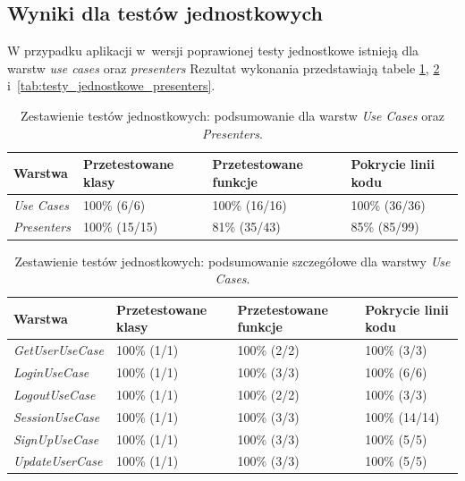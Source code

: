 \subsection{Wyniki dla testów jednostkowych}
W przypadku aplikacji w~wersji poprawionej testy jednostkowe istnieją dla warstw \textit{use cases} oraz \textit{presenters} Rezultat wykonania przedstawiają tabele \ref{tab:testy_jednostkowe_razem}, \ref{tab:testy_jednostkowe_usecases} i~\ref{tab:testy_jednostkowe_presenters}.
\begin{table}[!htb]
\centering
\caption{Zestawienie testów jednostkowych: podsumowanie dla warstw \textit{Use Cases} oraz \textit{Presenters}.}
\label{tab:testy_jednostkowe_razem}
\begin{tabular}{|p{5.8cm}|p{3cm}|p{3cm}|p{3cm}|}
\hline
\textbf{Warstwa} & \textbf{Przetestowane klasy} & \textbf{Przetestowane funkcje} & \textbf{Pokrycie linii kodu} \\ \hline
\textit{Use Cases} & 100\% (6/6) & 100\% (16/16) & 100\% (36/36)	\\ \hline
\textit{Presenters} & 100\% (15/15)	& 81\% (35/43) & 85\% (85/99) \\ \hline
\end{tabular}
\end{table}

\begin{table}[!htb]
\centering
\caption{Zestawienie testów jednostkowych: podsumowanie szczegółowe dla warstwy \textit{Use Cases}.}
\label{tab:testy_jednostkowe_usecases}
\begin{tabular}{|p{5.8cm}|p{3cm}|p{3cm}|p{3cm}|}
\hline
\textbf{Warstwa} & \textbf{Przetestowane klasy} & \textbf{Przetestowane funkcje} & \textbf{Pokrycie linii kodu} \\ \hline
\textit{GetUserUseCase} & 100\% (1/1) & 100\% (2/2) & 100\% (3/3)	\\ \hline
\textit{LoginUseCase} & 100\% (1/1) & 100\% (3/3) & 100\% (6/6)	\\ \hline
\textit{LogoutUseCase} & 100\% (1/1) & 100\% (2/2) & 100\% (3/3)	\\ \hline
\textit{SessionUseCase} & 100\% (1/1) & 100\% (3/3) & 100\% (14/14)	\\ \hline
\textit{SignUpUseCase} & 100\% (1/1) & 100\% (3/3) & 100\% (5/5)	\\ \hline
\textit{UpdateUserCase} & 100\% (1/1) & 100\% (3/3) & 100\% (5/5)	\\ \hline
\end{tabular}
\end{table}

